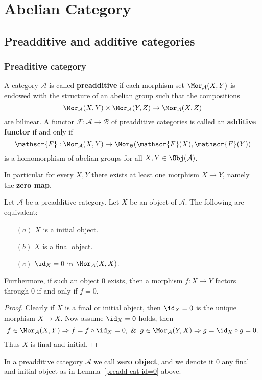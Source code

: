 \section{Abelian Category}
\subsection{Preadditive and additive categories}
\subsubsection{Preaditive category}
\begin{definition}
A category $\mathcal{A}$ is called \textbf{preadditive} if each morphism set $\Mor_{\mathcal{A}}(X,Y)$ is endowed with the structure of an abelian group such that the compositions
\[\Mor_{\mathcal{A}}(X,Y)\times \Mor_{\mathcal{A}}(Y,Z)\to\Mor_{\mathcal{A}}(X,Z)\]
are bilinear. A functor $\mathscr{F}:\mathcal{A}\to\mathcal{B}$ of preadditive categories is called an \textbf{additive functor} if and only if 
\[\mathscr{F}:\Mor_{\mathcal{A}}(X,Y)\to\Mor_{\mathcal{B}}(\mathscr{F}(X),\mathscr{F}(Y))\] 
is a homomorphism of abelian groups for all $X,Y\in\Obj(\mathcal{A})$.
\end{definition}
In particular for every $X,Y$ there exists at least one morphism $X\to Y$, namely the \textbf{zero map}.
\begin{lemma}\label{preadd cat id=0}
Let $\mathcal{A}$ be a preadditive category. Let $X$ be an object of $\mathcal{A}$. The following are equivalent:
\begin{itemize}
\item[$(a)$] $X$ is a initial object.
\item[$(b)$] $X$ is a final object.
\item[$(c)$] $\id_X=0$ in $\Mor_{\mathcal{A}}(X,X)$.
\end{itemize}
Furthermore, if such an object $0$ exists, then a morphism $f:X\to Y$ factors through $0$ if and only if $f=0$.
\end{lemma}
\begin{proof}
Clearly if $X$ is a final or initial object, then $\id_X=0$ is the unique morphism $X\to X$. Now assume $\id_X=0$ holds, then \[f\in\Mor_{\mathcal{A}}(X,Y)\Rightarrow f=f\circ\id_X=0,\And g\in\Mor_{\mathcal{A}}(Y,X)\Rightarrow g=\id_X\circ g=0.\] 
Thus $X$ is final and initial.
\end{proof}
\begin{definition}
In a preadditive category $\mathcal{A}$ we call \textbf{zero object}, and we denote it $0$ any final and initial object as in Lemma~\ref{preadd cat id=0} above.
\end{definition}
